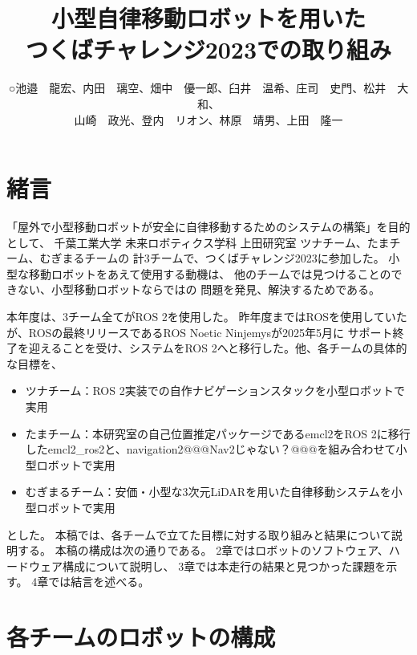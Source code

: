 \documentclass[twocolumn,9pt]{jsproceedings}
\title{小型自律移動ロボットを用いた\\つくばチャレンジ2023での取り組み}
\author{○池邉　龍宏\authorrefmark{2}、内田　璃空\authorrefmark{2}、畑中　優一郎\authorrefmark{1}、臼井　温希\authorrefmark{1}、庄司　史門\authorrefmark{1}、松井　大和\authorrefmark{1}、\\
山崎　政光\authorrefmark{1}、登内　リオン\authorrefmark{1}、林原　靖男\authorrefmark{1}、上田　隆一\authorrefmark{1}}
\affiliation{千葉工業大学 未来ロボティクス学科 ツナチーム/たまチーム/むぎまるチーム}
\begin{document}
\maketitle


\section{緒言}

「屋外で小型移動ロボットが安全に自律移動するためのシステムの構築」を目的として、
千葉工業大学 未来ロボティクス学科 上田研究室 ツナチーム、たまチーム、むぎまるチームの
計3チームで、つくばチャレンジ2023に参加した。
小型な移動ロボットをあえて使用する動機は、
他のチームでは見つけることのできない、小型移動ロボットならではの
問題を発見、解決するためである。

本年度は、3チーム全てがROS 2を使用した。
昨年度まではROSを使用していたが、ROSの最終リリースであるROS Noetic Ninjemysが2025年5月に
サポート終了を迎えることを受け、システムをROS 2へと移行した。他、各チームの具体的な目標を、

\begin{itemize}
  \item ツナチーム：ROS 2実装での自作ナビゲーションスタックを小型ロボットで実用
  \item たまチーム：本研究室の自己位置推定パッケージであるemcl2\cite{emcl2}をROS 2に移行したemcl2\_ros2\cite{emcl2_ros2}と、navigation2@@@Nav2じゃない？@@@を組み合わせて小型ロボットで実用
  \item むぎまるチーム：安価・小型な3次元LiDARを用いた自律移動システムを小型ロボットで実用
\end{itemize}
とした。
本稿では、各チームで立てた目標に対する取り組みと結果について説明する。
本稿の構成は次の通りである。
2章ではロボットのソフトウェア、ハードウェア構成について説明し、
3章では本走行の結果と見つかった課題を示す。
4章では結言を述べる。

\section{各チームのロボットの構成}
\end{document}
